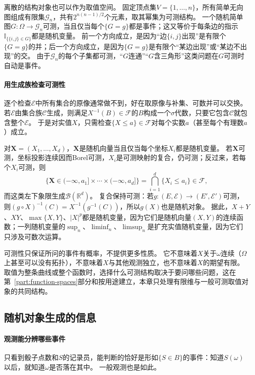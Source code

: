 离散的结构对象也可以作为取值空间。
固定顶点集$V=\{1,\dots,n\}$，所有简单无向图组成有限集$\mathcal G_n$，共有$2^{n(n-1)/2}$个元素，取其幂集为可测结构。
一个随机简单图$G:\Omega\to\mathcal G_n$可测，当且仅当每个$\{G=g\}$都是事件；这又等价于每条边的指示$\mathbb I_{\{\{i,j\}\in G\}}$都是随机变量。
前一个方向成立，是因为“边$\{i,j\}$出现”是有限个$\{G=g\}$的并；后一个方向成立，是因为$\{G=g\}$是有限个“某边出现”或“某边不出现”的交。
由于$\mathcal G_n$的每个子集都可测，“$G$连通”“$G$含三角形”这类问题在$G$可测时自动是事件。

\paragraph{用生成族检查可测性}
逐个检查$\mathcal E$中所有集合的原像通常做不到，好在取原像与补集、可数并可以交换。
若$\mathcal E$由集合族$\mathcal C$生成，则满足$X^{-1}(B)\in\mathcal F$的$B$构成一个$\sigma$代数，只要它包含$\mathcal C$就包含整个$\mathcal E$。
于是对实值$X$，只需检查$\{X\le a\}\in\mathcal F$对每个实数$a$（甚至每个有理数$a$）成立。

对$\bm X=(X_1,\dots,X_d)$，$\bm X$是随机向量当且仅当每个坐标$X_i$都是随机变量。
若$\bm X$可测，坐标投影连续因而Borel可测，$X_i$是可测映射的复合，仍可测；反过来，若每个$X_i$可测，则
\[
  \{\bm X\in(-\infty,a_1]\times\cdots\times(-\infty,a_d]\}=\bigcap_{i=1}^d\{X_i\le a_i\}\in\mathcal F,
\]
而这类左下象限生成$\mathcal B(\mathbb R^d)$。
复合保持可测：若$g:(E,\mathcal E)\to(E',\mathcal E')$可测，则$(g\circ X)^{-1}(C)=X^{-1}(g^{-1}(C))$，所以$g(X)$也是随机对象。
据此，$X+Y$、$XY$、$\max\{X,Y\}$、$|X|^p$都是随机变量，因为它们是随机向量$(X,Y)$的连续函数；一列随机变量的$\sup_n$、$\liminf_n$、$\limsup_n$是扩充实值随机变量，因为它们只涉及可数次运算。

可测性只保证所问的事件有概率，不提供更多性质。
它不意味着$X$关于$\omega$连续（$\Omega$上甚至可以没有拓扑），不意味着$X$与其他观测独立，也不意味着$X$的期望有限。
取值为整条曲线或整个函数时，选择什么可测结构取决于要问哪些问题，这在第~\ref{part:function-spaces}部分和按用途建立，本章只处理有限维与一般可测取值对象的共同结构。

\subsection{随机对象生成的信息}

\paragraph{观测能分辨哪些事件}
只看到骰子点数和$S$的记录员，能判断的恰好是形如$\{S\in B\}$的事件：知道$S(\omega)$以后，就知道$\omega$是否落在其中。
一般观测也是如此。

